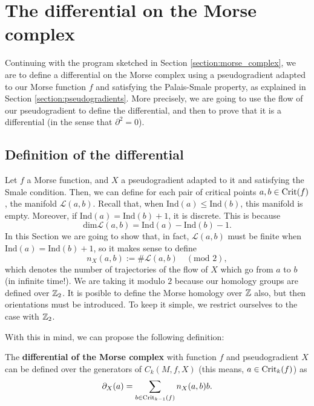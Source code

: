 \section{The differential on the Morse complex} \label{section:morse_differential}

Continuing with the program sketched in Section \ref{section:morse_complex}, we are to define a differential on the Morse complex using a pseudogradient adapted to our Morse function $f$ and satisfying the Palais-Smale property, as explained in Section \ref{section:pseudogradients}. More precisely, we are going to use the flow of our pseudogradient to define the differential, and then to prove that it is a differential (in the sense that $\partial^2 = 0$).

\subsection{Definition of the differential}

Let $f$ a Morse function, and $X$ a pseudogradient adapted to it and satisfying the Smale condition. Then, we can define for each pair of critical points $a, b \in \text{Crit}(f)$, the manifold $\mathcal{L}(a,b)$. Recall that, when $\text{Ind}(a) \leq \text{Ind}(b)$, this manifold is empty. Moreover, if $\text{Ind}(a) = \text{Ind}(b) + 1$, it is discrete. This is because
$$\text{dim} \mathcal{L}(a,b) = \text{Ind}(a) - \text{Ind}(b) - 1 .$$
In this Section we are going to show that, in fact, $\mathcal{L}(a,b)$ must be finite when $\text{Ind}(a) = \text{Ind}(b) + 1$, so it makes sense to define
$$n_X(a,b) := \# \mathcal{L}(a,b) \quad (\text{mod } 2),$$
which denotes the number of trajectories of the flow of $X$ which go from $a$ to $b$ (in infinite time!). We are taking it modulo $2$ because our homology groups are defined over $\mathbb{Z}_2$. It is posible to define the Morse homology over $\mathbb{Z}$ also, but then orientations must be introduced. To keep it simple, we restrict ourselves to the case with $\mathbb{Z}_2$.

With this in mind, we can propose the following definition:

\begin{deff}
The {\bf differential of the Morse complex} with function $f$ and pseudogradient $X$ can be defined over the generators of $C_k(M,f,X)$ (this means, $a \in \text{Crit}_k(f)$) as
\begin{displaymath}
\partial_X (a) = \sum_{b \in \text{Crit}_{k-1}(f)} n_X(a,b) b .
\end{displaymath}
\end{deff}

